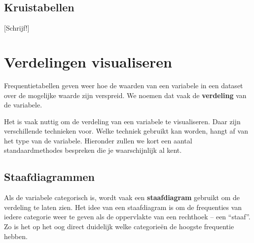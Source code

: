 \documentclass[
  a4paper,
]{scrbook}
\theoremstyle{definition}
\theoremstyle{definition}
\theoremstyle{remark}
\begin{document}
\subsection{Kruistabellen}\label{kruistabellen}

{[}Schrijf!{]}

\section{Verdelingen visualiseren}\label{verdelingen-visualiseren}

Frequentietabellen geven weer hoe de waarden van een variabele in een
dataset over de mogelijke waarde zijn verspreid. We noemen dat vaak de
\textbf{verdeling} van de variabele.

Het is vaak nuttig om de verdeling van een variabele te visualiseren.
Daar zijn verschillende technieken voor. Welke techniek gebruikt kan
worden, hangt af van het type van de variabele. Hieronder zullen we kort
een aantal standaardmethodes bespreken die je waarschijnlijk al kent.

\subsection{Staafdiagrammen}\label{staafdiagrammen}

Als de variabele categorisch is, wordt vaak een \textbf{staafdiagram}
gebruikt om de verdeling te laten zien. Het idee van een staafdiagram is
om de frequenties van iedere categorie weer te geven als de oppervlakte
van een rechthoek -- een ``staaf''. Zo is het op het oog direct
duidelijk welke categorieën de hoogste frequentie hebben.
\end{document}
